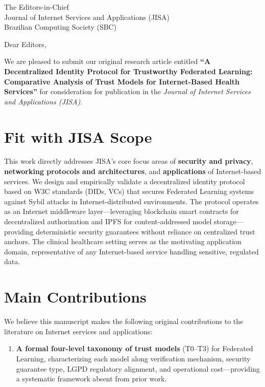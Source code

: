 \documentclass[11pt]{letter}
\begin{document}
\begin{letter}{The Editors-in-Chief \\
Journal of Internet Services and Applications (JISA) \\
Brazilian Computing Society (SBC)}

\opening{Dear Editors,}

We are pleased to submit our original research article entitled \textbf{``A Decentralized Identity Protocol for Trustworthy Federated Learning: Comparative Analysis of Trust Models for Internet-Based Health Services''} for consideration for publication in the \textit{Journal of Internet Services and Applications (JISA)}.

\section*{Fit with JISA Scope}

This work directly addresses JISA's core focus areas of \textbf{security and privacy}, \textbf{networking protocols and architectures}, and \textbf{applications} of Internet-based services. We design and empirically validate a decentralized identity protocol based on W3C standards (DIDs, VCs) that secures Federated Learning systems against Sybil attacks in Internet-distributed environments. The protocol operates as an Internet middleware layer---leveraging blockchain smart contracts for decentralized authorization and IPFS for content-addressed model storage---providing deterministic security guarantees without reliance on centralized trust anchors. The clinical healthcare setting serves as the motivating application domain, representative of any Internet-based service handling sensitive, regulated data.

\section*{Main Contributions}

We believe this manuscript makes the following original contributions to the literature on Internet services and applications:

\begin{enumerate}
  \item \textbf{A formal four-level taxonomy of trust models} (T0--T3) for Federated Learning, characterizing each model along verification mechanism, security guarantee type, LGPD regulatory alignment, and operational cost---providing a systematic framework absent from prior work.


\end{enumerate}
\end{letter}
\end{document}
